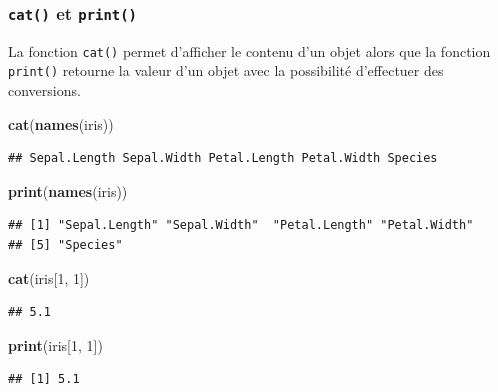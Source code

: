 \documentclass[]{book}
\newenvironment{Shaded}{\begin{snugshade}}{\end{snugshade}}
\newcommand{\DecValTok}[1]{\textcolor[rgb]{0.00,0.00,0.81}{#1}}
\newcommand{\KeywordTok}[1]{\textcolor[rgb]{0.13,0.29,0.53}{\textbf{#1}}}
\newcommand{\NormalTok}[1]{#1}
\begin{document}
\hypertarget{l015print}{%
\subsubsection{\texorpdfstring{\texttt{cat()} et \texttt{print()}}{cat() et print()}}\label{l015print}}

La fonction \texttt{cat()} permet d'afficher le contenu d'un objet alors que la fonction \texttt{print()} retourne la valeur d'un objet avec la possibilité d'effectuer des conversions.

\begin{Shaded}
\begin{Highlighting}[]
\KeywordTok{cat}\NormalTok{(}\KeywordTok{names}\NormalTok{(iris))}
\end{Highlighting}
\end{Shaded}

\begin{verbatim}
## Sepal.Length Sepal.Width Petal.Length Petal.Width Species
\end{verbatim}

\begin{Shaded}
\begin{Highlighting}[]
\KeywordTok{print}\NormalTok{(}\KeywordTok{names}\NormalTok{(iris))}
\end{Highlighting}
\end{Shaded}

\begin{verbatim}
## [1] "Sepal.Length" "Sepal.Width"  "Petal.Length" "Petal.Width" 
## [5] "Species"
\end{verbatim}

\begin{Shaded}
\begin{Highlighting}[]
\KeywordTok{cat}\NormalTok{(iris[}\DecValTok{1}\NormalTok{, }\DecValTok{1}\NormalTok{])}
\end{Highlighting}
\end{Shaded}

\begin{verbatim}
## 5.1
\end{verbatim}

\begin{Shaded}
\begin{Highlighting}[]
\KeywordTok{print}\NormalTok{(iris[}\DecValTok{1}\NormalTok{, }\DecValTok{1}\NormalTok{])}
\end{Highlighting}
\end{Shaded}

\begin{verbatim}
## [1] 5.1
\end{verbatim}
\end{document}
